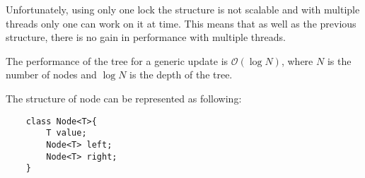 Unfortunately, using only one lock the structure is not scalable and with multiple threads only one  can work on it at time. This means that as well as the previous structure, there is no gain in performance with multiple threads.


The performance of the tree for a generic update is $\mathcal{O}(\log N)$, where $N$ is the number of nodes and $\log N$ is the depth of the tree.\newline

The structure of node can be represented as following:\newline

\begin{lstlisting}
	class Node<T>{
		T value;
		Node<T> left;
		Node<T> right;
	}
\end{lstlisting}

